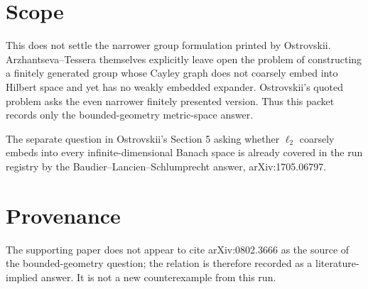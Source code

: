\documentclass[11pt]{amsart}
\begin{document}
\section*{Scope}

This does not settle the narrower group formulation printed by Ostrovskii.
Arzhantseva--Tessera themselves explicitly leave open the problem of
constructing a finitely generated group whose Cayley graph does not coarsely
embed into Hilbert space and yet has no weakly embedded expander. Ostrovskii's
quoted problem asks the even narrower finitely presented version. Thus this
packet records only the bounded-geometry metric-space answer.

The separate question in Ostrovskii's Section 5 asking whether
\(\ell_2\) coarsely embeds into every infinite-dimensional Banach space is
already covered in the run registry by the Baudier--Lancien--Schlumprecht
answer, arXiv:1705.06797.

\section*{Provenance}

The supporting paper does not appear to cite arXiv:0802.3666 as the source of
the bounded-geometry question; the relation is therefore recorded as a
literature-implied answer. It is not a new counterexample from this run.
\end{document}

